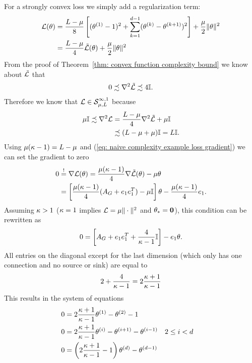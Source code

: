 For a strongly convex loss we simply add a regularization term:
%
\begin{align*}
	\loss(\weights)
	&= \frac{\ubound -\lbound}{8} \left[
		(\weights^{(1)}-1)^2
		+ \sum_{k=1}^{\dimension-1} (\weights^{(k)}-\weights^{(k+1)})^2
	\right]
	+ \frac\lbound{2} \| \weights \|^2\\
	&= \frac{\ubound - \lbound}{4} \tilde{\loss}(\weights)
	+ \frac{\lbound}{2}\| \weights \|^2
\end{align*}
%
From the proof of Theorem~\ref{thm: convex function complexity bound} we know
about \(\tilde{\loss}\) that
%
\begin{align*}
	0 \precsim \nabla^2\tilde{\loss} \precsim 4\identity.
\end{align*}
%
Therefore we know that \(\loss\in\strongConvex[\infty,1]{\lbound}{\ubound}\) because
%
\begin{align*}
	\lbound\identity
	\precsim \nabla^2\loss
	&= \frac{\ubound - \lbound}{4} \nabla^2 \tilde{\loss} + \lbound\identity\\
	&\precsim (\ubound - \lbound + \lbound)\identity = \ubound \identity.
\end{align*}
%
Using \(\lbound(\condition -1)=\ubound-\lbound\) and (\ref{eq: naive complexity
example loss gradient}) we can set the gradient to zero
\begin{align*}
	0 &\lxeq{!} \nabla \loss(\weights)
	=  \frac{\lbound(\condition -1)}{4} \nabla\tilde{\loss}(\weights) - \lbound \weights\\
	&= \left[
		\frac{\lbound(\condition-1)}{4}(A_G + \stdBasis_1\stdBasis_1^T) - \lbound\identity
	\right]\weights - \frac{\lbound(\condition-1)}{4}\stdBasis_1.
\end{align*}
%
Assuming \(\condition>1\) (\(\condition=1\) implies \(\loss=\lbound\|\cdot\|^2\) and
\(\minimum=\mathbf{0}\)),
this condition can be rewritten as
%
\begin{align*}
	0 =  \left[
		A_G + \stdBasis_1\stdBasis_1^T + \frac{4}{\condition-1}\identity
	\right] - \stdBasis_1
	\weights.
\end{align*}
%
All entries on the diagonal except for the last dimension (which only has one
connection and no source or sink) are equal to
%
\begin{align*}
	2+\frac{4}{\condition-1} = 2\frac{\condition +1}{\condition-1}
\end{align*}
%
This results in the system of equations
%
\begin{subequations}
\label{eq: solution to the strongly convex coloring problem}
\begin{align*}
	0&=2\frac{\condition+1}{\condition -1}\weights^{(1)} - \weights^{(2)} -1 \\
	0&=2\frac{\condition+1}{\condition -1}\weights^{(i)}
	- \weights^{(i+1)} - \weights^{(i-1)}  && 2\le i <d \\
	0&= \left(2\frac{\condition+1}{\condition -1} -1 \right)\weights^{(d)}
	- \weights^{(d-1)}
\end{align*}
\end{subequations}
